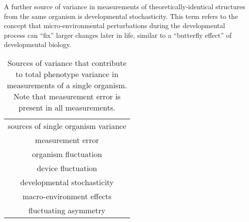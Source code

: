 A further source of variance in measurements of theoretically-identical structures from the same organism is developmental stochasticity.
This term refers to the concept that micro-environmental perturbations during the developmental process can ``fix'' larger changes later in life, similar to a ``butterfly effect'' of developmental biology.

\begin{sidewaystable}
	\centering
	\begin{tabular}{c}
	\cmidrule[0.1pt]{1-1}
		\hspace{1cm}sources of single organism variance\hspace*{1cm}\\
	\cmidrule[1pt]{1-1}
		measurement error\\
		organism fluctuation\\
		device fluctuation\\
		developmental stochasticity\\
		macro-environment effects\\
		fluctuating asymmetry\\
	\cmidrule[0.1pt]{1-1}
	\end{tabular}
	\caption[
		Sources of variance in measurements of a single organism.
	]
	{
		Sources of variance that contribute to total phenotype variance in measurements of a single organism.
		Note that measurement error is present in all measurements.
}
\end{sidewaystable}
